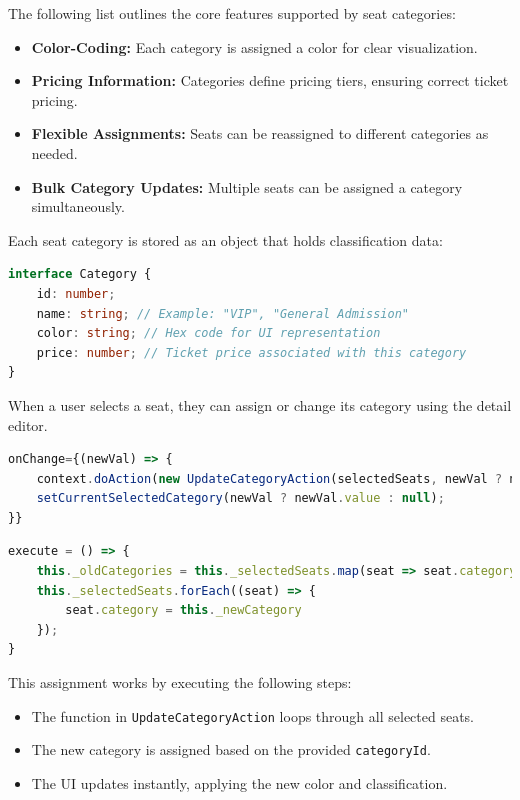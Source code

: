 The following list outlines the core features supported by seat categories:
\begin{itemize}
    \item \textbf{Color-Coding:} Each category is assigned a color for clear visualization.
    \item \textbf{Pricing Information:} Categories define pricing tiers, ensuring correct ticket pricing.
    \item \textbf{Flexible Assignments:} Seats can be reassigned to different categories as needed.
    \item \textbf{Bulk Category Updates:} Multiple seats can be assigned a category simultaneously.
\end{itemize}

\newpage

Each seat category is stored as an object that holds classification data:

\begin{lstlisting}[language=TypeScript, caption=Seat Category Data Model, label=lst:seat-category-model]
interface Category {
    id: number;
    name: string; // Example: "VIP", "General Admission"
    color: string; // Hex code for UI representation
    price: number; // Ticket price associated with this category
}
\end{lstlisting}

When a user selects a seat, they can assign or change its category using the detail editor.

\begin{lstlisting}[language=TypeScript, caption=Update Category Action Call, label=lst:assign-category]
onChange={(newVal) => {
    context.doAction(new UpdateCategoryAction(selectedSeats, newVal ? newVal.value : null))
    setCurrentSelectedCategory(newVal ? newVal.value : null);
}}
\end{lstlisting}

\begin{lstlisting}[language=TypeScript, caption=Update Category Action, label=lst:assign-category]
execute = () => {
    this._oldCategories = this._selectedSeats.map(seat => seat.category)
    this._selectedSeats.forEach((seat) => {
        seat.category = this._newCategory
    });
}
\end{lstlisting}

This assignment works by executing the following steps:
\begin{itemize}
    \item The function in \texttt{UpdateCategoryAction} loops through all selected seats.
    \item The new category is assigned based on the provided \texttt{categoryId}.
    \item The UI updates instantly, applying the new color and classification.
\end{itemize}

